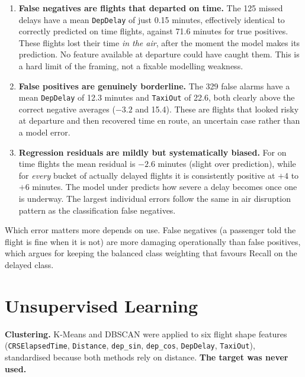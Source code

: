 \documentclass[11pt,a4paper]{article}
\begin{document}
\begin{enumerate}[leftmargin=1.5em,itemsep=3pt]
  \item \textbf{False negatives are flights that departed on time.} The 125 missed
        delays have a mean \texttt{DepDelay} of just 0.15 minutes, effectively identical
        to correctly predicted on time flights, against 71.6 minutes for true positives.
        These flights lost their time \emph{in the air}, after the moment the model makes
        its prediction. No feature available at departure could have caught them. This is
        a hard limit of the framing, not a fixable modelling weakness.
  \item \textbf{False positives are genuinely borderline.} The 329 false alarms have a
        mean \texttt{DepDelay} of 12.3 minutes and \texttt{TaxiOut} of 22.6, both clearly
        above the correct negative averages ($-3.2$ and 15.4). These are flights that
        looked risky at departure and then recovered time en route, an uncertain case
        rather than a model error.
  \item \textbf{Regression residuals are mildly but systematically biased.} For on time
        flights the mean residual is $-2.6$ minutes (slight over prediction), while for
        \emph{every} bucket of actually delayed flights it is consistently positive at
        $+4$ to $+6$ minutes. The model under predicts how severe a delay becomes once
        one is underway. The largest individual errors follow the same in air disruption
        pattern as the classification false negatives.
\end{enumerate}

Which error matters more depends on use. False negatives (a passenger told the flight is
fine when it is not) are more damaging operationally than false positives, which argues
for keeping the balanced class weighting that favours Recall on the delayed class.

\section{Unsupervised Learning}

\textbf{Clustering.} K-Means and DBSCAN were applied to six flight shape features
(\texttt{CRSElapsedTime}, \texttt{Distance}, \texttt{dep\_sin}, \texttt{dep\_cos},
\texttt{DepDelay}, \texttt{TaxiOut}), standardised because both methods rely on
distance. \textbf{The target was never used.}
\end{document}
